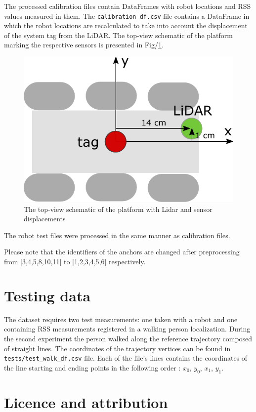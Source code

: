 \documentclass[conference]{IEEEtran}
\begin{document}
The processed calibration files contain DataFrames with robot locations and RSS values measured in them. The \texttt{calibration\_df.csv} file contains a DataFrame in which the robot locations are recalculated to take into account the displacement of the system tag from the LiDAR. The top-view schematic of the platform marking the respective sensors is presented in Fig/\ref{fig:displacement}.

\begin{figure}[h]
\centering
\includegraphics[width=.8\columnwidth]{figs/displacement}
\caption{\label{fig:displacement}The top-view schematic of the platform with Lidar and sensor displacements}
\end{figure}

The robot test files were processed in the same manner as calibration files.


\color{red}
Please note that the identifiers of the anchors are changed after preprocessing from [3,4,5,8,10,11] to [1,2,3,4,5,6] respectively.
\color{black}


\section{Testing data}
The dataset requires two test measurements: one taken with a robot and one containing RSS measurements registered in a walking person localization. During the second experiment the person walked along the reference trajectory composed of straight lines. The coordinates of the trajectory vertices can be found in \texttt{tests/test\_walk\_df.csv} file. Each of the file's lines contains the coordinates of the line starting and ending points in the following order : $x_0$, $y_0$, $x_1$, $y_1$.


\section{Licence and attribution}
\end{document}

